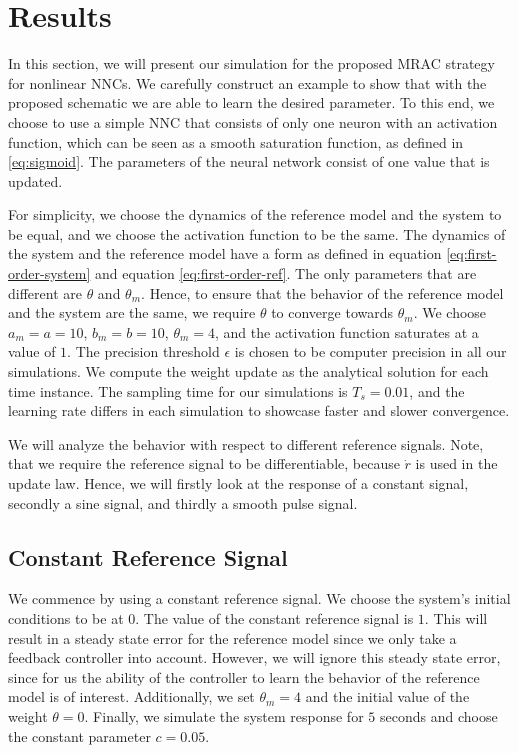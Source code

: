 \section{Results}

In this section, we will present our simulation for the proposed MRAC strategy for nonlinear NNCs. We carefully construct an example to show that with the proposed schematic we are able to learn the desired parameter. To this end, we choose to use a simple NNC that consists of only one neuron with an activation function, which can be seen as a smooth saturation function, as defined in \eqref{eq:sigmoid}. The parameters of the neural network consist of one value that is updated.

For simplicity, we choose the dynamics of the reference model and the system to be equal, and we choose the activation function to be the same. The dynamics of the system and the reference model have a form as defined in equation \eqref{eq:first-order-system} and equation \eqref{eq:first-order-ref}. The only parameters that are different are $\theta$ and $\theta_m$. Hence, to ensure that the behavior of the reference model and the system are the same, we require $\theta$ to converge towards $\theta_m$. We choose $a_m=a=10$, $b_m=b=10$, $\theta_m=4$, and the activation function saturates at a value of $1$. The precision threshold $\epsilon$ is chosen to be computer precision in all our simulations. We compute the weight update as the analytical solution for each time instance. The sampling time for our simulations is $T_s=0.01$, and the learning rate differs in each simulation to showcase faster and slower convergence.

We will analyze the behavior with respect to different reference signals. Note, that we require the reference signal to be differentiable, because $\dot r$ is used in the update law. Hence, we will firstly look at the response of a constant signal, secondly a sine signal, and thirdly a smooth pulse signal.

\subsection{Constant Reference Signal}
We commence by using a constant reference signal. We choose the system's initial conditions to be at $0$. The value of the constant reference signal is $1$. This will result in a steady state error for the reference model since we only take a feedback controller into account. However, we will ignore this steady state error, since for us the ability of the controller to learn the behavior of the reference model is of interest. Additionally, we set $\theta_m=4$ and the initial value of the weight $\theta=0$. Finally, we simulate the system response for $5$ seconds and choose the constant parameter $c=0.05$.


